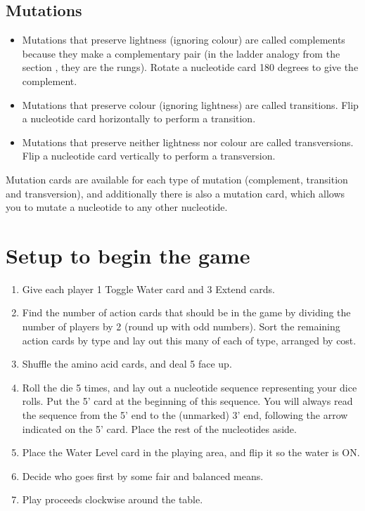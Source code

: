 \documentclass[a4paper,11pt,oneside]{memoir}
\begin{document}

\subsection*{Mutations}

\begin{itemize}
    \item Mutations that preserve lightness (ignoring colour) are called complements because they make a complementary pair (in the ladder analogy from the section \textbf{}, they are the rungs).  Rotate a nucleotide card 180 degrees to give the complement.
    \item Mutations that preserve colour (ignoring lightness) are called transitions.  Flip a nucleotide card horizontally to perform a transition.
    \item Mutations that preserve neither lightness nor colour are called transversions.  Flip a nucleotide card vertically to perform a transversion. \\
\end{itemize}

Mutation cards are available for each type of mutation (complement, transition and transversion), and additionally there is also a mutation card, which allows you to mutate a nucleotide to any other nucleotide. 


\section*{Setup to begin the game}

\begin{enumerate}
    \item Give each player 1 Toggle Water card and 3 Extend cards.
    \item Find the number of action cards that should be in the game by dividing the number of players by 2 (round up with odd numbers).  Sort the remaining action cards by type and lay out this many of each of type, arranged by cost.
    \item Shuffle the amino acid cards, and deal 5 face up.  
    \item Roll the die 5 times, and lay out a nucleotide sequence representing your dice rolls.  Put the 5' card at the beginning of this sequence.  You will always read the sequence from the 5' end to the (unmarked) 3' end, following the arrow indicated on the 5' card.  Place the rest of the nucleotides aside. 
    \item Place the Water Level card in the playing area, and flip it so the water is ON.
    \item Decide who goes first by some fair and balanced means.
    \item Play proceeds clockwise around the table.\\
\end{enumerate}
\end{document}
